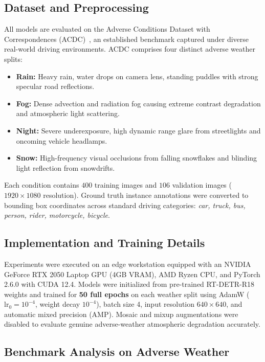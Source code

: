 \documentclass[conference]{IEEEtran}
\begin{document}
\subsection{Dataset and Preprocessing}
All models are evaluated on the Adverse Conditions Dataset with Correspondences (ACDC)~\cite{sakaridis2021acdc}, an established benchmark captured under diverse real-world driving environments. ACDC comprises four distinct adverse weather splits:
\begin{itemize}
    \item \textbf{Rain:} Heavy rain, water drops on camera lens, standing puddles with strong specular road reflections.
    \item \textbf{Fog:} Dense advection and radiation fog causing extreme contrast degradation and atmospheric light scattering.
    \item \textbf{Night:} Severe underexposure, high dynamic range glare from streetlights and oncoming vehicle headlamps.
    \item \textbf{Snow:} High-frequency visual occlusions from falling snowflakes and blinding light reflection from snowdrifts.
\end{itemize}
Each condition contains $400$ training images and $106$ validation images ($1920 \times 1080$ resolution). Ground truth instance annotations were converted to bounding box coordinates across standard driving categories: \textit{car, truck, bus, person, rider, motorcycle, bicycle}.

\subsection{Implementation and Training Details}
Experiments were executed on an edge workstation equipped with an NVIDIA GeForce RTX 2050 Laptop GPU (4GB VRAM), AMD Ryzen CPU, and PyTorch 2.6.0 with CUDA 12.4. Models were initialized from pre-trained RT-DETR-R18 weights and trained for \textbf{50 full epochs} on each weather split using AdamW ($\text{lr}_0 = 10^{-4}$, weight decay $10^{-4}$), batch size 4, input resolution $640 \times 640$, and automatic mixed precision (AMP). Mosaic and mixup augmentations were disabled to evaluate genuine adverse-weather atmospheric degradation accurately.

\subsection{Benchmark Analysis on Adverse Weather}
\end{document}
